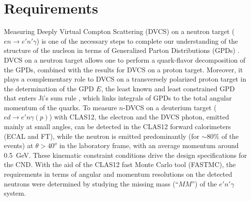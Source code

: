 \section{Requirements}

Measuring Deeply Virtual Compton Scattering (DVCS) on a neutron target ($en \to e' n' \gamma$) is one of the necessary steps to complete
our understanding of the structure of the nucleon in terms of Generalized Parton Distributions (GPDs) \cite{Mueller:1998fv,Ji:1996ek,Radyushkin:1996nd}.
DVCS on a neutron target allows one to perform a quark-flavor decomposition of the GPDs, combined with the results for DVCS on a proton target.
Moreover, it plays a complementary role to DVCS on a transversely polarized proton target in the determination of the GPD $E$, the least known and least
constrained GPD that enters Ji's sum rule \cite{Ji:1996ek}, which links integrals of GPDs to the total angular momentum of the quarks.
To measure $n$-DVCS on a deuterium target ($ed\to e'n\gamma(p)$) with CLAS12, the electron and the DVCS photon, emitted mainly at small angles, can be detected in the CLAS12 forward calorimeters (ECAL \cite{ecal_nim} and FT\cite{ft_nim}), while the neutron is emitted predominantly (for $\sim 80$\% of the events) at $\theta> 40^o$ in the laboratory frame, with an average momentum around 0.5~GeV.
These kinematic constraint conditions drive the design specifications for the CND. %
With the aid of the CLAS12 fast Monte Carlo tool (FASTMC), the requirements in terms of angular and momentum resolutions on the detected neutrons were determined by studying the missing mass (``$MM$'') of the $e'n'\gamma$ system.
%
